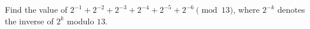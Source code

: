 Find the value of $2^{-1}+2^{-2}+2^{-3}+2^{-4}+2^{-5}+2^{-6}\pmod{13}$, where $2^{-k}$ denotes the inverse of $2^k$ modulo $13$.
